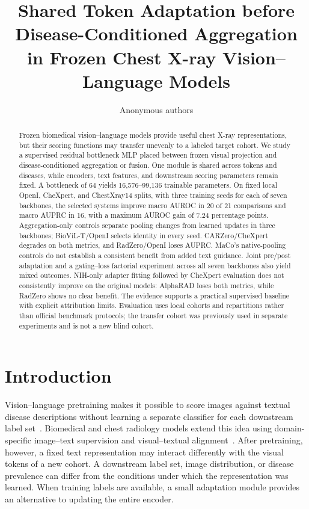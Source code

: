 \documentclass[10pt,twocolumn,letterpaper]{article}
\title{Shared Token Adaptation before Disease-Conditioned Aggregation\\
in Frozen Chest X-ray Vision--Language Models}
\author{Anonymous authors}
\begin{document}
\maketitle

\begin{abstract}
Frozen biomedical vision--language models provide useful chest X-ray representations, but their scoring functions may transfer unevenly to a labeled target cohort. We study a supervised residual bottleneck MLP placed between frozen visual projection and disease-conditioned aggregation or fusion. One module is shared across tokens and diseases, while encoders, text features, and downstream scoring parameters remain fixed. A bottleneck of 64 yields 16,576--99,136 trainable parameters. On fixed local OpenI, CheXpert, and ChestXray14 splits, with three training seeds for each of seven backbones, the selected systems improve macro AUROC in 20 of 21 comparisons and macro AUPRC in 16, with a maximum AUROC gain of 7.24 percentage points. Aggregation-only controls separate pooling changes from learned updates in three backbones; BioViL-T/OpenI selects identity in every seed. CARZero/CheXpert degrades on both metrics, and RadZero/OpenI loses AUPRC. MaCo's native-pooling controls do not establish a consistent benefit from added text guidance. Joint pre/post adaptation and a gating--loss factorial experiment across all seven backbones also yield mixed outcomes. NIH-only adapter fitting followed by CheXpert evaluation does not consistently improve on the original models: AlphaRAD loses both metrics, while RadZero shows no clear benefit. The evidence supports a practical supervised baseline with explicit attribution limits. Evaluation uses local cohorts and repartitions rather than official benchmark protocols; the transfer cohort was previously used in separate experiments and is not a new blind cohort.
\end{abstract}

\section{Introduction}
Vision--language pretraining makes it possible to score images against textual disease descriptions without learning a separate classifier for each downstream label set~\cite{radford2021clip}. Biomedical and chest radiology models extend this idea using domain-specific image--text supervision and visual--textual alignment~\cite{zhang2025biomedclip,huang2024maco,park2025radzero,you2026alpharad}. After pretraining, however, a fixed text representation may interact differently with the visual tokens of a new cohort. A downstream label set, image distribution, or disease prevalence can differ from the conditions under which the representation was learned. When training labels are available, a small adaptation module provides an alternative to updating the entire encoder.
\end{document}
